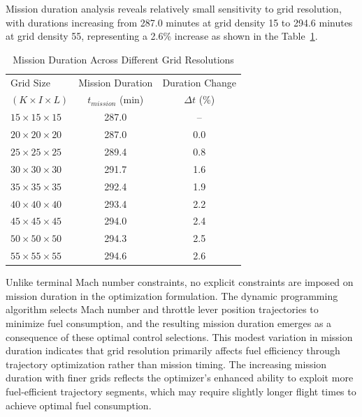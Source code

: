 Mission duration analysis reveals relatively small sensitivity to grid resolution, with durations increasing from 287.0 minutes at grid density 15 to 294.6 minutes at grid density 55, representing a 2.6\% increase as shown in the 
Table~\ref{tab:mission_duration}. 


\begin{table}[h]
    \centering
    \footnotesize
    \begin{tabular}{l c c}
        \hline
        Grid Size & Mission Duration & Duration Change \\
        $(K \times I \times L)$ & $t_{mission}$ (min) & $\Delta t$ (\%) \\
        \hline
        $15 \times 15 \times 15$ & 287.0 & -- \\
        $20 \times 20 \times 20$ & 287.0 & 0.0 \\
        $25 \times 25 \times 25$ & 289.4 & 0.8 \\
        $30 \times 30 \times 30$ & 291.7 & 1.6 \\
        $35 \times 35 \times 35$ & 292.4 & 1.9 \\
        $40 \times 40 \times 40$ & 293.4 & 2.2 \\
        $45 \times 45 \times 45$ & 294.0 & 2.4 \\
        $50 \times 50 \times 50$ & 294.3 & 2.5 \\
        $55 \times 55 \times 55$ & 294.6 & 2.6 \\
        \hline
    \end{tabular}
    \caption{Mission Duration Across Different Grid Resolutions}
    \label{tab:mission_duration}
\end{table}


Unlike terminal Mach number constraints, no explicit constraints are imposed on mission duration in the optimization formulation. The dynamic programming algorithm selects Mach number and throttle lever position trajectories to minimize fuel consumption, and the resulting mission duration emerges as a consequence of these optimal control selections. This modest variation in mission duration indicates that grid resolution primarily affects fuel efficiency through trajectory optimization rather than mission timing. The increasing mission duration with finer grids reflects the optimizer's enhanced ability to exploit more fuel-efficient trajectory segments, which may require slightly longer flight times to achieve optimal fuel consumption.







 
 

